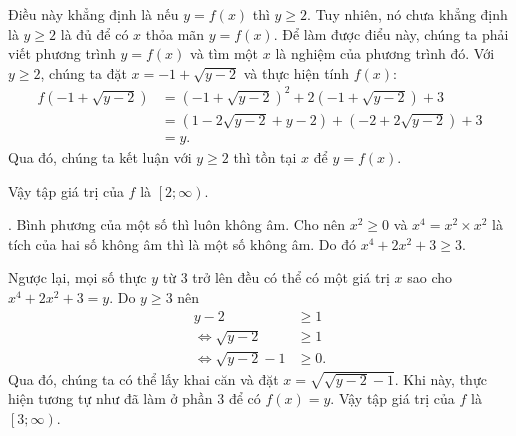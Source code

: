 Điều này khẳng định là nếu $y = f(x)$ thì $y \geq 2$. Tuy nhiên, nó chưa khẳng định là $y \geq 2$ là đủ để có $x$ thỏa mãn $y = f(x)$. Để làm được điểu này, chúng ta phải viết phương trình $y = f(x)$ và tìm một $x$ là nghiệm của phương trình đó. Với $y\geq 2$, chúng ta đặt $x = -1 + \sqrt{y - 2}$ và thực hiện tính $f(x)$:
\begin{align*}
   f\left(-1 + \sqrt{y - 2}\right) &= \left(-1 + \sqrt{y - 2}\right)^2 + 2\left(-1 + \sqrt{y - 2}\right) + 3 \\
   &= \left(1 - 2\sqrt{y - 2} + y - 2\right) + \left(- 2 + 2\sqrt{y - 2}\right) + 3 \\
   &= y.
\end{align*}
Qua đó, chúng ta kết luận với $y \geq 2$ thì tồn tại $x$ để $y = f(x)$.

Vậy tập giá trị của $f$ là $\left[2; \infty\right)$.

. Bình phương của một số thì luôn không âm. Cho nên $x^2 \geq 0$ và $x^4 = x^2 \times x^2$ là tích của hai số không âm thì là một số không âm. Do đó $x^4 + 2x^2 + 3 \geq 3$.

Ngược lại, mọi số thực $y$ từ $3$ trở lên đều có thể có một giá trị $x$ sao cho $x^4 + 2x^2 + 3 = y$. Do $y \geq 3$ nên
\begin{align*}
   y - 2 &\geq 1 \\
   \iff \sqrt{y - 2} &\geq 1 \\
   \iff \sqrt{y - 2} - 1 &\geq 0.
\end{align*}
Qua đó, chúng ta có thể lấy khai căn và đặt $x = \sqrt{\sqrt{y - 2} - 1}$. Khi này, thực hiện tương tự như đã làm ở phần 3 để có $f(x) = y$. Vậy tập giá trị của $f$ là $\left[3; \infty\right)$.


